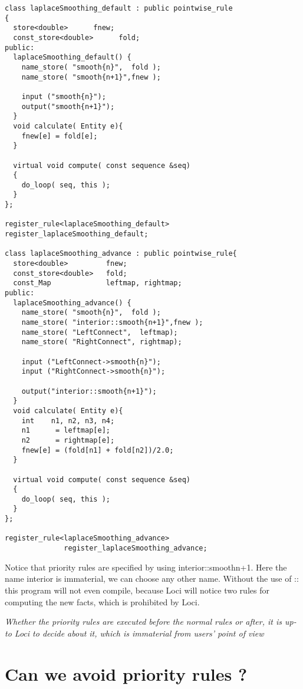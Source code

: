 \begin{verbatim}
class laplaceSmoothing_default : public pointwise_rule 
{
  store<double>      fnew;
  const_store<double>      fold;
public:
  laplaceSmoothing_default() {
    name_store( "smooth{n}",  fold );
    name_store( "smooth{n+1}",fnew );
    
    input ("smooth{n}");
    output("smooth{n+1}");
  }
  void calculate( Entity e){
    fnew[e] = fold[e];
  }

  virtual void compute( const sequence &seq)
  {
    do_loop( seq, this );
  }
};

register_rule<laplaceSmoothing_default> register_laplaceSmoothing_default;

class laplaceSmoothing_advance : public pointwise_rule{
  store<double>         fnew;
  const_store<double>   fold;
  const_Map             leftmap, rightmap;
public:
  laplaceSmoothing_advance() {
    name_store( "smooth{n}",  fold );
    name_store( "interior::smooth{n+1}",fnew );
    name_store( "LeftConnect",  leftmap);
    name_store( "RightConnect", rightmap);
    
    input ("LeftConnect->smooth{n}");
    input ("RightConnect->smooth{n}");

    output("interior::smooth{n+1}");
  }
  void calculate( Entity e){
    int    n1, n2, n3, n4;
    n1      = leftmap[e];
    n2      = rightmap[e];
    fnew[e] = (fold[n1] + fold[n2])/2.0;
  }

  virtual void compute( const sequence &seq)
  {
    do_loop( seq, this );
  }
};

register_rule<laplaceSmoothing_advance>
              register_laplaceSmoothing_advance;

\end{verbatim}

\par Notice that priority rules are specified by using interior::smooth{n+1}.
Here the name interior is immaterial, we can choose any other name. Without
the use of :: this program will not even compile, because Loci will notice
two rules for computing the new facts, which is prohibited by Loci. 

{\par \em  Whether the priority rules are executed before the normal rules
or after, it is up-to Loci to decide about it, which is immaterial from users' point of view }

\section {Can we avoid priority rules ? }

